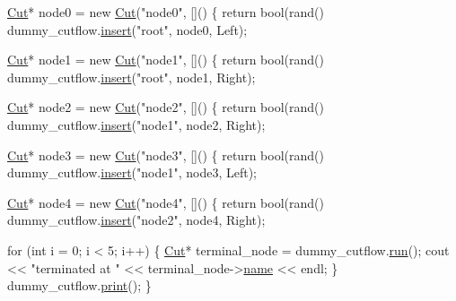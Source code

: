 \begin{DoxyEnumerate}
\begin{DoxyCode}
    \hyperlink{classCut}{Cut}* node0 = \textcolor{keyword}{new} \hyperlink{classCut}{Cut}(\textcolor{stringliteral}{"node0"}, []() \{ \textcolor{keywordflow}{return} bool(rand() %
    dummy\_cutflow.\hyperlink{classCutflow_a8da46f1053a6b97991489ee0920c29a1}{insert}(\textcolor{stringliteral}{"root"}, node0, Left);

    \hyperlink{classCut}{Cut}* node1 = \textcolor{keyword}{new} \hyperlink{classCut}{Cut}(\textcolor{stringliteral}{"node1"}, []() \{ \textcolor{keywordflow}{return} bool(rand() %
    dummy\_cutflow.\hyperlink{classCutflow_a8da46f1053a6b97991489ee0920c29a1}{insert}(\textcolor{stringliteral}{"root"}, node1, Right);

    \hyperlink{classCut}{Cut}* node2 = \textcolor{keyword}{new} \hyperlink{classCut}{Cut}(\textcolor{stringliteral}{"node2"}, []() \{ \textcolor{keywordflow}{return} bool(rand() %
    dummy\_cutflow.\hyperlink{classCutflow_a8da46f1053a6b97991489ee0920c29a1}{insert}(\textcolor{stringliteral}{"node1"}, node2, Right);

    \hyperlink{classCut}{Cut}* node3 = \textcolor{keyword}{new} \hyperlink{classCut}{Cut}(\textcolor{stringliteral}{"node3"}, []() \{ \textcolor{keywordflow}{return} bool(rand() %
    dummy\_cutflow.\hyperlink{classCutflow_a8da46f1053a6b97991489ee0920c29a1}{insert}(\textcolor{stringliteral}{"node1"}, node3, Left);

    \hyperlink{classCut}{Cut}* node4 = \textcolor{keyword}{new} \hyperlink{classCut}{Cut}(\textcolor{stringliteral}{"node4"}, []() \{ \textcolor{keywordflow}{return} bool(rand() %
    dummy\_cutflow.\hyperlink{classCutflow_a8da46f1053a6b97991489ee0920c29a1}{insert}(\textcolor{stringliteral}{"node2"}, node4, Right);

    \textcolor{keywordflow}{for} (\textcolor{keywordtype}{int} i = 0; i < 5; i++)
    \{
        \hyperlink{classCut}{Cut}* terminal\_node = dummy\_cutflow.\hyperlink{classCutflow_a563da4fc41aa5c611dd0ce37ce966f2c}{run}();
        cout << \textcolor{stringliteral}{"terminated at "} << terminal\_node->\hyperlink{classCut_accf700d2d00746b97a265d4aea3f55c2}{name} << endl;
    \}
    dummy\_cutflow.\hyperlink{classCutflow_a0cb4c8bd6d15ace1f85fe0cfb8d9d828}{print}();
\}
\end{DoxyCode}
 
\end{DoxyEnumerate}